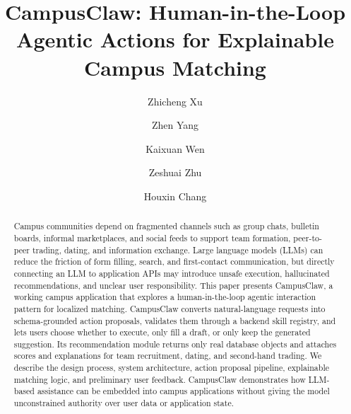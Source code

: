 \documentclass[sigconf]{acmart}
\begin{document}
\title[CampusClaw]{CampusClaw: Human-in-the-Loop Agentic Actions for Explainable Campus Matching}

\author{Zhicheng Xu}

\author{Zhen Yang}

\author{Kaixuan Wen}

\author{Zeshuai Zhu}

\author{Houxin Chang}

\renewcommand{\shortauthors}{Xu et al.}

\begin{abstract}
Campus communities depend on fragmented channels such as group chats, bulletin boards, informal marketplaces, and social feeds to support team formation, peer-to-peer trading, dating, and information exchange. Large language models (LLMs) can reduce the friction of form filling, search, and first-contact communication, but directly connecting an LLM to application APIs may introduce unsafe execution, hallucinated recommendations, and unclear user responsibility. This paper presents CampusClaw, a working campus application that explores a human-in-the-loop agentic interaction pattern for localized matching. CampusClaw converts natural-language requests into schema-grounded action proposals, validates them through a backend skill registry, and lets users choose whether to execute, only fill a draft, or only keep the generated suggestion. Its recommendation module returns only real database objects and attaches scores and explanations for team recruitment, dating, and second-hand trading. We describe the design process, system architecture, action proposal pipeline, explainable matching logic, and preliminary user feedback. CampusClaw demonstrates how LLM-based assistance can be embedded into campus applications without giving the model unconstrained authority over user data or application state.
\end{abstract}
\end{document}
